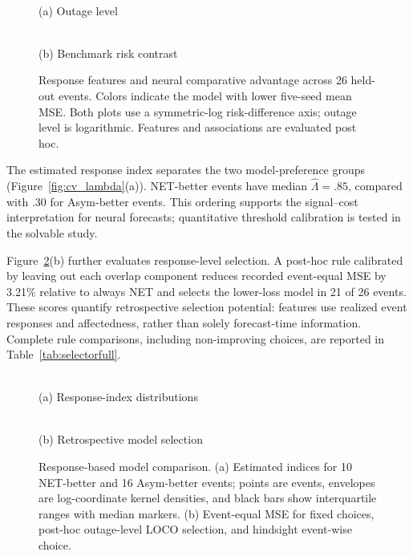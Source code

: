 \begin{figure}[!t]
\centering
\begin{minipage}[t]{.485\textwidth}\centering
{}\\[-2pt]
\small (a) Outage level
\end{minipage}\hfill
\begin{minipage}[t]{.485\textwidth}\centering
{}\\[-2pt]
\small (b) Benchmark risk contrast
\end{minipage}
\caption{Response features and neural comparative advantage across 26 held-out events. Colors indicate the model with lower five-seed mean MSE. Both plots use a symmetric-log risk-difference axis; outage level is logarithmic. Features and associations are evaluated post hoc.}
\label{fig:cv_features}
\end{figure}

The estimated response index separates the two model-preference groups (Figure~\ref{fig:cv_lambda}(a)). NET-better events have median $\widehat\Lambda=.85$, compared with $.30$ for Asym-better events. This ordering supports the signal--cost interpretation for neural forecasts; quantitative threshold calibration is tested in the solvable study.

Figure~\ref{fig:selection_risk}(b) further evaluates response-level selection. A post-hoc rule calibrated by leaving out each overlap component reduces recorded event-equal MSE by 3.21\% relative to always NET and selects the lower-loss model in 21 of 26 events. These scores quantify retrospective selection potential: features use realized event responses and affectedness, rather than solely forecast-time information. Complete rule comparisons, including non-improving choices, are reported in Table~\ref{tab:selectorfull}.

\begin{figure}[!t]
\centering
\begin{minipage}[t]{.485\textwidth}\centering
{}\\[-1pt]
\small (a) Response-index distributions
\end{minipage}\hfill
\begin{minipage}[t]{.485\textwidth}\centering
{}\\[-1pt]
\small (b) Retrospective model selection
\end{minipage}
\caption{Response-based model comparison. (a) Estimated indices for 10 NET-better and 16 Asym-better events; points are events, envelopes are log-coordinate kernel densities, and black bars show interquartile ranges with median markers. (b) Event-equal MSE for fixed choices, post-hoc outage-level LOCO selection, and hindsight event-wise choice.}
\label{fig:cv_lambda}
\label{fig:selection_risk}
\end{figure}

